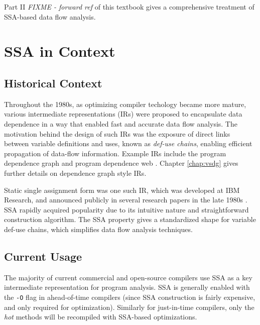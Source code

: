 Part II 
\emph{FIXME - forward ref}
of this textbook gives a comprehensive treatment of 
SSA-based data flow analysis.



\section{SSA in Context}




\subsection{Historical Context}

Throughout the 1980s, as optimizing compiler
techology became more mature, various intermediate
representations (IRs) were proposed to encapsulate data
dependence in a way that enabled fast and accurate
data flow analysis.
The motivation behind the design of
such IRs was the exposure of direct links between variable
definitions and uses, known as \textit{def-use chains},
enabling efficient propagation of data-flow information.
Example IRs include the program dependence graph \cite{ferrante87program}
and program dependence web \cite{ottenstein90program}.
Chapter \ref{chap:vsdg} gives further details on dependence graph
style IRs.


Static single assignment form was one such IR, 
which was developed at IBM Research, and announced publicly
in several research papers in the late 1980s
\cite{rosen88global,alpern88detecting,cytron89efficient}.
SSA rapidly acquired popularity due to its 
intuitive nature and straightforward
construction algorithm.
The SSA property gives a 
standardized shape for variable def-use chains,
which simplifies data flow analysis techniques.

\subsection{Current Usage}

The majority of current commercial and open-source compilers
use SSA as a key intermediate representation for
program analysis.
SSA is generally enabled with the \texttt{-O}
flag in ahead-of-time compilers (since SSA construction
is fairly expensive, and only required for optimization).
Similarly for just-in-time compilers, only the \textit{hot} 
methods will be recompiled with SSA-based optimizations.

